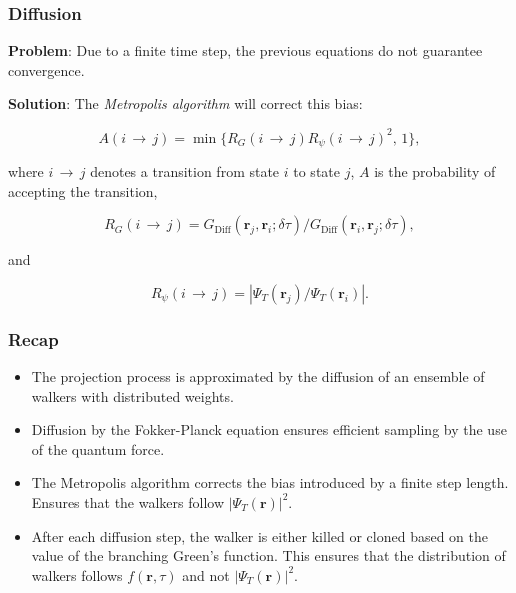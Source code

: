 \begin{frame}
\frametitle{Diffusion}

\textbf{Problem}: Due to a finite time step, the previous equations do not guarantee convergence.  
\shift

\textbf{Solution}: The \textit{Metropolis algorithm} will correct this bias:  

\begin{equation}
  A(i\,\rightarrow\,j) = \min\{R_G(i\,\rightarrow\,j)R_\psi(i\,\rightarrow\,j)^2, \,1\},
\end{equation}

where $i\,\rightarrow\,j$ denotes a transition from state $i$ to state $j$, $A$ is the probability of accepting the transition, 

\begin{equation*}
 R_G(i\,\rightarrow\,j) = G_\mathrm{Diff}(\mathbf{r}_{j}, \mathbf{r}_{i}; \delta\tau)/G_\mathrm{Diff}(\mathbf{r}_{i}, \mathbf{r}_{j}; \delta\tau),
\end{equation*}

and

\begin{equation*}
 R_\psi(i\,\rightarrow\,j) = |\Psi_T(\mathbf{r}_j)/\Psi_T(\mathbf{r}_i)|.
\end{equation*}

\end{frame}



\begin{frame}
 \frametitle{Recap}
 
 \begin{itemize}
 \item The projection process is approximated by the diffusion of an ensemble of walkers with distributed weights.
 \pause \item Diffusion by the Fokker-Planck equation ensures efficient sampling by the use of the quantum force.
 \pause \item The Metropolis algorithm corrects the bias introduced by a finite step length. Ensures that the walkers follow $|\Psi_T(\mathbf{r})|^2$.
 \pause \item After each diffusion step, the walker is either killed or cloned based on the value of the branching Green's function. This ensures that the distribution of walkers follows $f(\mathbf{r}, \tau)$ and not $|\Psi_T(\mathbf{r})|^2$.
 \end{itemize}

\end{frame}

